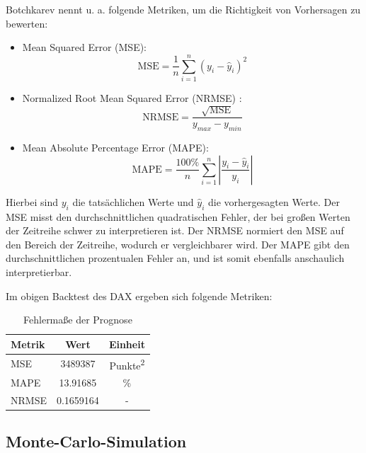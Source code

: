 \begin{lemma}
Botchkarev \cite{botchkarev_performance_2019} nennt u. a. folgende Metriken, um die Richtigkeit von Vorhersagen zu bewerten:
\begin{itemize}
    \item Mean Squared Error (MSE): $$\text{MSE} = \frac{1}{n} \sum_{i=1}^n (y_i - \hat{y}_i)^2$$
    \item Normalized Root Mean Squared Error (NRMSE) : $$\text{NRMSE} = \frac{\sqrt{\text{MSE}}}{y_{max} - y_{min}}$$
    \item Mean Absolute Percentage Error (MAPE): $$\text{MAPE} = \frac{100\%}{n} \sum_{i=1}^n \left|\frac{y_i - \hat{y}_i}{y_i}\right|$$
\end{itemize}

Hierbei sind $y_i$ die tatsächlichen Werte und $\hat{y}_i$ die vorhergesagten Werte.
Der MSE misst den durchschnittlichen quadratischen Fehler, der bei großen Werten der Zeitreihe schwer 
zu interpretieren ist. Der NRMSE normiert den MSE auf den Bereich der Zeitreihe,
wodurch er vergleichbarer wird. Der MAPE gibt den durchschnittlichen prozentualen Fehler an, und ist
somit ebenfalls anschaulich interpretierbar.

\end{lemma}

\begin{bsp}
Im obigen Backtest des DAX ergeben sich folgende Metriken:

\begin{table}[h]
    \centering
    \begin{tabular}{lcc}
        \toprule
        Metrik & Wert & Einheit \\
        \midrule
        MSE    & 3489387 & Punkte\textsuperscript{2} \\
        MAPE   & 13.91685   & \% \\
        NRMSE  & 0.1659164 & - \\
        \bottomrule
    \end{tabular}
    \caption{Fehlermaße der Prognose}
    \label{tab:metrics}
\end{table}

\end{bsp}

\subsection{Monte-Carlo-Simulation}

